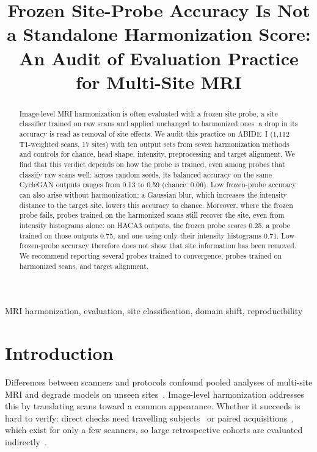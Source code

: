 \documentclass{article}
\title{Frozen Site-Probe Accuracy Is Not a Standalone Harmonization Score:\\
An Audit of Evaluation Practice for Multi-Site MRI}
\begin{document}
\raggedbottom
\maketitle

\begin{abstract}
Image-level MRI harmonization is often evaluated with a frozen site probe, a site classifier trained on raw scans and applied unchanged to harmonized ones: a drop in its accuracy is read as removal of site effects. We audit this practice on ABIDE~I (1,112 T1-weighted scans, 17 sites) with ten output sets from seven harmonization methods and controls for chance, head shape, intensity, preprocessing and target alignment. We find that this verdict depends on how the probe is trained, even among probes that classify raw scans well: across random seeds, its balanced accuracy on the same CycleGAN outputs ranges from 0.13 to 0.59 (chance: 0.06). Low frozen-probe accuracy can also arise without harmonization: a Gaussian blur, which increases the intensity distance to the target site, lowers this accuracy to chance. Moreover, where the frozen probe fails, probes trained on the harmonized scans still recover the site, even from intensity histograms alone: on HACA3 outputs, the frozen probe scores 0.25, a probe trained on those outputs 0.75, and one using only their intensity histograms 0.71. Low frozen-probe accuracy therefore does not show that site information has been removed. We recommend reporting several probes trained to convergence, probes trained on harmonized scans, and target alignment.
\end{abstract}

\begin{keywords}
MRI harmonization, evaluation, site classification, domain shift, reproducibility
\end{keywords}

\section{Introduction}
\label{sec:intro}
Differences between scanners and protocols confound pooled analyses of multi-site MRI and degrade models on unseen sites~\cite{fortin2018harmonization,glocker2019multisite}. Image-level harmonization addresses this by translating scans toward a common appearance. Whether it succeeds is hard to verify: direct checks need travelling subjects~\cite{tanaka2021srpbs} or paired acquisitions~\cite{dewey2019deepharmony}, which exist for only a few scanners, so large retrospective cohorts are evaluated indirectly~\cite{hu2023harmonization}.
\end{document}
